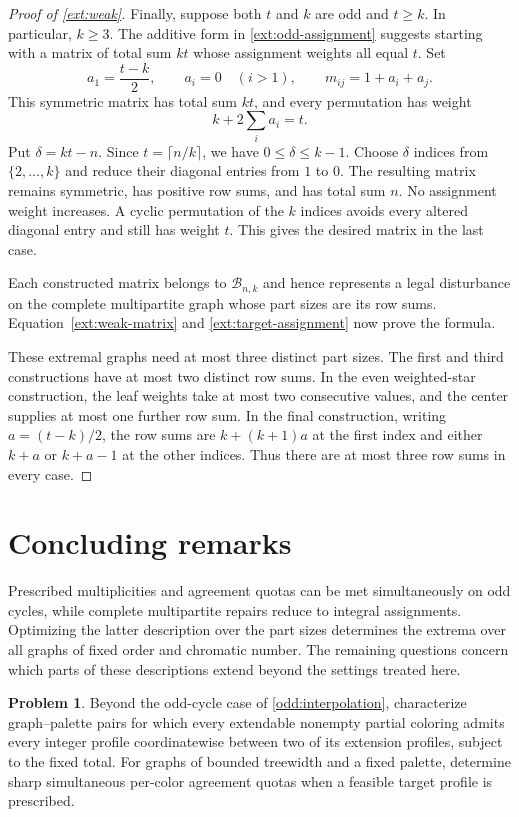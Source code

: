 \documentclass[10pt,a4paper]{amsart}
\numberwithin{equation}{section}
\theoremstyle{definition}
\newtheorem{problem}[theorem]{Problem}
\theoremstyle{remark}
\begin{document}
\begin{proof}[Proof of \cref{ext:weak}]
Finally, suppose both $t$ and $k$ are odd and $t\ge k$. In
particular, $k\ge3$. The additive form in
\cref{ext:odd-assignment} suggests starting with a matrix of total
sum $kt$ whose assignment weights all equal $t$. Set
\[
 a_1=\frac{t-k}{2},\qquad a_i=0\quad(i>1),
 \qquad m_{ij}=1+a_i+a_j.
\]
This symmetric matrix has total sum $kt$, and every permutation has
weight
\[
 k+2\sum_i a_i=t.
\]
Put $\delta=kt-n$.  Since $t=\lceil n/k\rceil$, we have
$0\le\delta\le k-1$.  Choose $\delta$ indices from
$\{2,\ldots,k\}$ and reduce their diagonal entries from $1$ to $0$.
The resulting matrix remains symmetric, has positive row sums, and
has total sum $n$.  No assignment weight increases.  A cyclic
permutation of the $k$ indices avoids every altered diagonal entry
and still has weight $t$.  This gives the desired matrix in the last
case.

Each constructed matrix belongs to $\mathcal B_{n,k}$ and hence
represents a legal disturbance on the complete multipartite graph
whose part sizes are its row sums.  Equation~\eqref{ext:weak-matrix}
and \eqref{ext:target-assignment} now prove the formula.

These extremal graphs need at most three distinct part sizes.
The first and third constructions have at most two distinct row sums.
In the even weighted-star construction, the leaf weights take at most
two consecutive values, and the center supplies at most one further
row sum. In the final construction, writing $a=(t-k)/2$, the row sums
are $k+(k+1)a$ at the first index and either $k+a$ or $k+a-1$ at the
other indices. Thus there are at most three row sums in every case.
\end{proof}


\section{Concluding remarks}\label{sec:questions}

Prescribed multiplicities and agreement quotas can be met simultaneously
on odd cycles, while complete multipartite repairs reduce to integral
assignments. Optimizing the latter description over the part sizes
determines the extrema over all graphs of fixed order and chromatic
number. The remaining questions concern which parts of these
descriptions extend beyond the settings treated here.

\begin{problem}\label{problem:profile-interpolation}
Beyond the odd-cycle case of \cref{odd:interpolation}, characterize
graph--palette pairs for which every extendable nonempty
partial coloring admits every integer profile coordinatewise between
two of its extension profiles, subject to the fixed total.
For graphs of bounded treewidth and a fixed palette, determine sharp
simultaneous per-color agreement quotas when a feasible target profile
is prescribed.
\end{problem}
\end{document}

